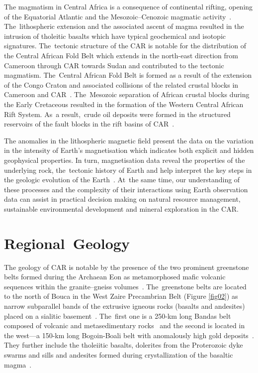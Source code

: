 \documentclass[minerals,article,accept,pdftex,moreauthors]{Definitions/mdpi}
\begin{document}
The magmatism in Central Africa is a consequence of continental rifting, opening of the Equatorial Atlantic and the Mesozoic--Cenozoic magmatic activity~\cite{WILSON1992203}. The~lithospheric extension and the associated ascent of magma resulted in the intrusion of tholeitic basalts which have typical geochemical and isotopic signatures. The~tectonic structure of {the} CAR is notable for the distribution of the Central African Fold Belt which extends in the north-east direction from Cameroon through CAR towards Sudan and contributed to the tectonic magmatism. The~Central African Fold Belt is formed as a result of the extension of the Congo Craton and associated collisions of the related crustal blocks in Cameroon and CAR~\cite{TOTEU2022296}. The~Mesozoic separation of African crustal blocks during the Early Cretaceous resulted in the formation of the Western Central African Rift System. As~a result,~crude oil deposits were formed in the structured reservoirs of the fault blocks in the rift basins of CAR~\cite{GENIK1992169}. %


The anomalies in the lithospheric magnetic field present the data on the variation in the intensity of Earth's magnetisation which indicates both explicit and hidden geophysical properties. {In turn, magnetisation data reveal the properties }of the underlying rock, the~tectonic history of Earth and help interpret the key steps in the geologic evolution of the Earth~\cite{Vervelidou}. %
At~the same time, our understanding of these processes and the complexity of their interactions using Earth observation data can assist in practical decision making on natural resource management, sustainable environmental development and mineral exploration in {the} CAR. 

\section{Regional~Geology} 

The geology of CAR is notable by the presence of the two prominent greenstone belts formed during the Archaean Eon as  metamorphosed mafic volcanic sequences within the granite--gneiss volumes~\cite{Poidevin1991LesCD}. The~greenstone belts are located to the north of Bouca in the West Zaire Precambrian Belt (Figure \ref{fig02}) as narrow subparallel bands of the extrusive igneous rocks (basalts and andesites) placed on a sialitic basement~\cite{Boulvert1983}. The~first one is a 250-km 
long Bandas belt composed of volcanic and metasedimentary rocks~\cite{POIDEVIN1981157} and the second is located in the west---a %
150-km long Bogoin-Boali belt with anomalously high gold deposits~\cite{Dostal}. They further include the tholeiitic basalts, dolerites from the Proterozoic dyke swarms and sills and andesites formed during crystallization of the basaltic magma~\cite{Poidevin1985}. 
\end{document}
